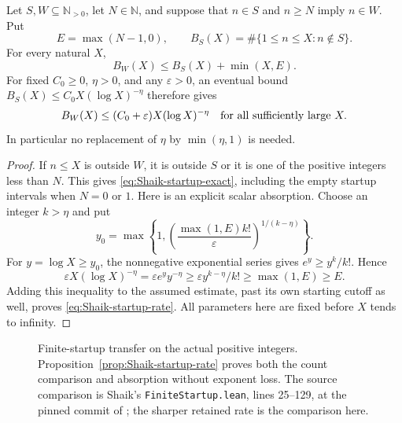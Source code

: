 \begin{proposition}
\label{prop:Shaik-startup-rate}
Let \(S,W\subseteq\mathbb N_{>0}\), let \(N\in\mathbb N\), and suppose
that \(n\in S\) and \(n\ge N\) imply \(n\in W\). Put
\[
 E=\max(N-1,0),\qquad
 B_S(X)=\#\{1\le n\le X:n\notin S\}.
\]
For every natural \(X\),
\begin{equation}\label{eq:Shaik-startup-exact}
 B_W(X)\le B_S(X)+\min(X,E).
\end{equation}
For fixed \(C_0\ge0\), \(\eta>0\), and any \(\varepsilon>0\), an
eventual bound \(B_S(X)\le C_0X(\log X)^{-\eta}\) therefore gives
\begin{equation}\label{eq:Shaik-startup-rate}
 B_W(X)\le(C_0+\varepsilon)X(\log X)^{-\eta}
 \quad\hbox{for all sufficiently large }X.
\end{equation}
In particular no replacement of \(\eta\) by \(\min(\eta,1)\) is needed.
\end{proposition}
\begin{proof}
If \(n\le X\) is outside \(W\), it is outside \(S\) or it is
one of the positive integers less than \(N\). This gives
\eqref{eq:Shaik-startup-exact}, including the empty startup intervals
when \(N=0\) or \(1\).
Here is an explicit scalar absorption. Choose an integer \(k>\eta\) and put
\[
 y_0=\max\left\{1,
 \left(\frac{\max(1,E)k!}{\varepsilon}\right)^{1/(k-\eta)}
 \right\}.
\]
For \(y=\log X\ge y_0\), the nonnegative exponential series gives
\(e^y\ge y^k/k!\). Hence
\[
 \varepsilon X(\log X)^{-\eta}
 =\varepsilon e^y y^{-\eta}
 \ge \varepsilon y^{k-\eta}/k!
 \ge \max(1,E)\ge E.
\]
Adding this inequality to the assumed estimate, past its own starting
cutoff as well, proves \eqref{eq:Shaik-startup-rate}.
All parameters here are fixed before \(X\) tends to infinity.
\end{proof}

\begin{figure}[ht]
\centering
{}
\caption{Finite-startup transfer on the actual positive integers.
Proposition~\ref{prop:Shaik-startup-rate} proves both the count comparison
and absorption without exponent loss. The source comparison is
Shaik's \texttt{FiniteStartup.lean}, lines 25--129, at the pinned commit
of \cite{Shaik2026v324}; the sharper retained rate is the comparison here.}
\end{figure}

